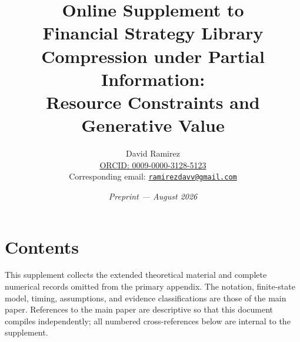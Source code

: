 \documentclass[11pt]{article}
\title{Online Supplement to\\
Financial Strategy Library Compression under Partial Information:\\
Resource Constraints and Generative Value}
\author{David Ramirez\\
\href{https://orcid.org/0009-0000-3128-5123}{ORCID: 0009-0000-3128-5123}\\
Corresponding email: \href{mailto:ramirezdavv@gmail.com}{\texttt{ramirezdavv@gmail.com}}}
\date{\textit{Preprint --- August 2026}}
\numberwithin{equation}{section}
\theoremstyle{definition}
\theoremstyle{plain}
\begin{document}
\maketitle
\thispagestyle{empty}
\clearpage

\section*{Contents}
\par\medskip
\makeatletter
{}
\makeatother
\clearpage

This supplement collects the extended theoretical material and complete
numerical records omitted from the primary appendix.  The notation,
finite-state model, timing, assumptions, and evidence classifications are
those of the main paper.  References to the main paper are descriptive so that
this document compiles independently; all numbered cross-references below are
internal to the supplement.









\end{document}
